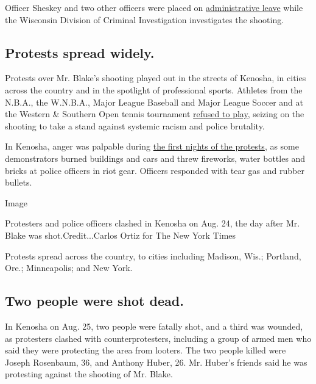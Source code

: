 Officer Sheskey and two other officers were placed on
\href{https://www.nytimes3xbfgragh.onion/2020/08/28/us/jacob-blake-shackles-assault.html}{administrative
leave} while the Wisconsin Division of Criminal Investigation
investigates the shooting.

\hypertarget{protests-spread-widely}{%
\subsection{Protests spread widely.}\label{protests-spread-widely}}

Protests over Mr. Blake's shooting played out in the streets of Kenosha,
in cities across the country and in the spotlight of professional
sports. Athletes from the N.B.A., the W.N.B.A., Major League Baseball
and Major League Soccer and at the Western \& Southern Open tennis
tournament
\href{https://www.nytimes3xbfgragh.onion/2020/08/26/sports/basketball/nba-boycott-bucks-magic-blake-shooting.html}{refused
to play}, seizing on the shooting to take a stand against systemic
racism and police brutality.

In Kenosha, anger was palpable during
\href{https://www.nytimes3xbfgragh.onion/2020/08/25/us/jacob-blake-kenosha-fires.html}{the
first nights of the protests}, as some demonstrators burned buildings
and cars and threw fireworks, water bottles and bricks at police
officers in riot gear. Officers responded with tear gas and rubber
bullets.

Image

Protesters and police officers clashed in Kenosha on Aug. 24, the day
after Mr. Blake was shot.Credit...Carlos Ortiz for The New York Times

Protests spread across the country, to cities including Madison, Wis.;
Portland, Ore.; Minneapolis; and New York.

\hypertarget{two-people-were-shot-dead}{%
\subsection{Two people were shot
dead.}\label{two-people-were-shot-dead}}

In Kenosha on Aug. 25, two people were fatally shot, and a third was
wounded, as protesters clashed with counterprotesters, including a group
of armed men who said they were protecting the area from looters. The
two people killed were Joseph Rosenbaum, 36, and Anthony Huber, 26. Mr.
Huber's friends said he was protesting against the shooting of Mr.
Blake.

